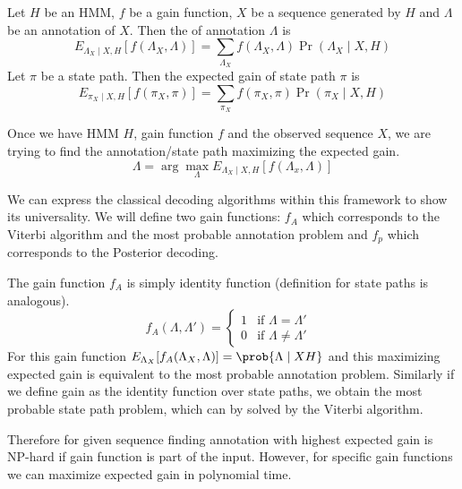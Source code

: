 \begin{definition}
Let $H$ be an HMM, $f$ be a gain function, $X$ be a sequence generated by $H$ and
$\Lambda$ be an annotation of $X$. Then the  of annotation
$\Lambda$ is 
\begin{equation}
E_{\Lambda_X\mid X,H}[f(\Lambda_X,\Lambda)] =
\sum_{\Lambda_X}f(\Lambda_X,\Lambda)\Pr\left(\Lambda_X\mid X,H\right)
\end{equation}
Let $\pi$ be a state path. Then the expected gain of state path $\pi$ is 
\begin{equation}
E_{\pi_X\mid X,H}[f(\pi_X,\pi)] =
\sum_{\pi_X}f(\pi_X,\pi)\Pr\left(\pi_X\mid X,H\right)
\end{equation}
\end{definition}


Once we have HMM $H$, gain function $f$ and the observed sequence $X$,
we are trying to find the annotation/state path maximizing the expected gain. 
\begin{equation}
\Lambda = \arg\max_{\Lambda}E_{\Lambda_X\mid
X,H}\left[f\left(\Lambda_x,\Lambda\right)\right]
\end{equation}

We can express the classical decoding algorithms within this framework to show
its universality. We will define two gain functions: $f_A$ which corresponds to
the  
Viterbi algorithm and the most probable annotation problem and $f_p$ which
corresponds to 
the Posterior decoding.

The gain function $f_A$ is simply identity function (definition for state paths
is analogous).
\begin{equation}
f_A(\Lambda,\Lambda') = \begin{cases}
1 & \text{if $\Lambda = \Lambda'$ }\\
0 & \text{if $\Lambda \not=\Lambda'$}
\end{cases}
\end{equation}
For this gain function $E_{\Lambda_X}[f_A(\Lambda_X,\Lambda)]=\prob{\Lambda\mid
X H}$ and this
maximizing expected gain is 
equivalent to the most probable annotation problem. Similarly if we define gain
as the identity function over state paths, we obtain the most probable state
path problem, which can by solved by the Viterbi algorithm.

Therefore for given sequence finding annotation with highest expected gain is
NP-hard if gain function is part of the input. However, for specific gain
functions we can maximize expected gain in polynomial time.

